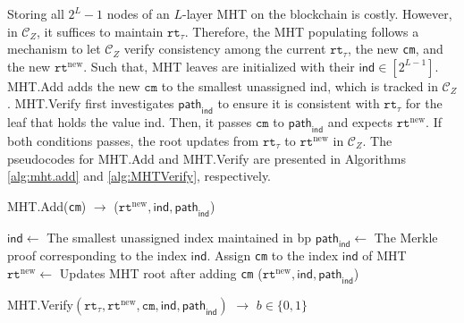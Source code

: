 Storing all $2^{L}-1$ nodes of an $L$-layer \textsf{MHT} on the blockchain is costly. However, in $\mathcal{C}_Z$, it suffices to maintain $\texttt{rt}_\tau$. Therefore, the \textsf{MHT} populating follows a  mechanism to let $\mathcal{C}_Z$ verify consistency among the current $\texttt{rt}_\tau$, the new \texttt{cm}, and the new $\texttt{rt}^\text{new}$. Such that, 
\textsf{MHT} leaves are initialized with their  $\textsf{ind} \in [ 2^{L-1}]$. 
\textsf{MHT}.\textsf{Add} adds the new $\texttt{cm}$ to the smallest unassigned \textsf{ind}, which is tracked in $\mathcal{C}_Z$. \textsf{MHT}.\textsf{Verify} first investigates $\textsf{path}_\textsf{ind}$ to ensure it is consistent with $\texttt{rt}_\tau$ for the leaf that holds the value \textsf{ind}.
Then, it passes $\texttt{cm}$ to $\textsf{path}_\textsf{ind}$ and expects $\texttt{rt}^\text{new}$. If both conditions passes, the root  updates from $\texttt{rt}_{\tau}$ to $ \texttt{rt}^\text{new}$ in $\mathcal{C}_Z$. The pseudocodes for \textsf{MHT}.\textsf{Add} and \textsf{MHT}.\textsf{Verify} are presented in Algorithms \ref{alg:mht.add} and \ref{alg:ٰMHTVerify}, respectively.


\begin{algorithm}
\caption{\textsf{MHT}.\textsf{Add}(\texttt{cm}) $\rightarrow$ ($\texttt{rt}^{\text{new}}, \textsf{ind}, \textsf{path}_\textsf{ind}$) }\label{alg:mht.add}
\begin{algorithmic}[1]
\State $\mathsf{ind} \gets $ The smallest unassigned index maintained in \gls{bp}
\State $\textsf{path}_\textsf{ind} \gets $ The Merkle proof corresponding to the index $\mathsf{ind}$.
\State Assign \texttt{cm} to the index $\mathsf{ind}$ of \textsf{MHT}
\State $\texttt{rt}^{\text{new} }\gets$ {Updates \textsf{MHT} root after adding \texttt{cm}}
\State \Return ($\texttt{rt}^{\text{new}}, \textsf{ind}, \textsf{path}_\textsf{ind}$)
\end{algorithmic}
\end{algorithm}


%

\begin{algorithm}
    \caption{\textsf{MHT}.\textsf{Verify}$(\texttt{rt}_{\tau}, \texttt{rt}^{\text{new}}, \texttt{cm}, \mathsf{ind}, \mathsf{path}_\mathsf{ind})$ $ \rightarrow $ $b \in \{0, 1\}$ }\label{alg:ٰMHTVerify}
	\begin{algorithmic}[1]
		\State {}
		\EndIf
		\State {}
		\EndIf
  
		\State {}
	\end{algorithmic}
\end{algorithm}


